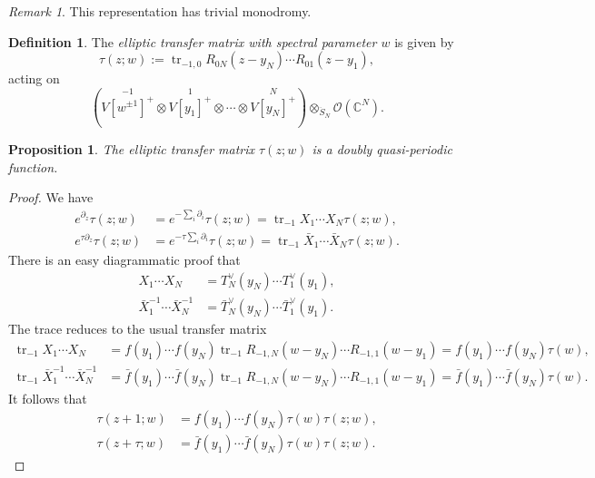 \documentclass[11pt]{report}
\newtheorem{prop}[theorem]{Proposition}
\theoremstyle{definition}
\newtheorem{definition}[theorem]{Definition}
\theoremstyle{remark}
\newtheorem*{remark}{Remark}
\theoremstyle{remark}
\newcommand{\C}{\mathbb{C}}
\begin{document}
\begin{remark}
This representation has trivial monodromy.
\end{remark}

\begin{definition}
The \emph{elliptic transfer matrix with spectral parameter $w$} is given by
\begin{equation*}
\tau(z;w) := \operatorname{tr}_{-1,0} R_{0N}(z-y_N) \cdots R_{01}(z-y_1),
\end{equation*}
acting on
\begin{equation*}
(\overset{-1}{V[w^{\pm 1}]^+} \otimes \overset{1}{V[y_1]^+} \otimes \cdots \otimes \overset{N}{V[y_N]^+}) \otimes_{\ddot S_N} \mathcal{O}(\C^N).
\end{equation*}
\end{definition}

\begin{prop}
The elliptic transfer matrix $\tau(z;w)$ is a doubly quasi-periodic function.
\end{prop}

\begin{proof}
We have
\begin{align*}
e^{\partial_z} \tau(z;w) &= e^{-\sum_i \partial_i} \tau(z;w) = \operatorname{tr}_{-1} X_1 \cdots X_N \tau(z;w), \\
e^{\tau \partial_z} \tau(z;w) &= e^{-\tau \sum_i \partial_i} \tau(z;w) = \operatorname{tr}_{-1} \bar X_1 \cdots \bar X_N \tau(z;w).
\end{align*}
There is an easy diagrammatic proof that
\begin{align*}
X_1 \cdots X_N &= T_N^\vee(y_N) \cdots T_1^\vee(y_1), \\
\bar X_1^{-1} \cdots \bar X_N^{-1} &= \bar T_N^\vee(y_N) \cdots \bar T_1^\vee(y_1).
\end{align*}
The trace reduces to the usual transfer matrix
\begin{align*}
\operatorname{tr}_{-1} X_1 \cdots X_N &= f(y_1) \cdots f(y_N) \operatorname{tr}_{-1} R_{-1,N}(w-y_N) \cdots R_{-1,1}(w-y_1) = f(y_1) \cdots f(y_N) \tau(w), \\
\operatorname{tr}_{-1} \bar X_1^{-1} \cdots \bar X_N^{-1} &= \bar f(y_1) \cdots \bar f(y_N) \operatorname{tr}_{-1} R_{-1,N}(w-y_N) \cdots R_{-1,1}(w-y_1) = \bar f(y_1) \cdots \bar f(y_N) \tau(w).
\end{align*}
It follows that
\begin{align*}
\tau(z+1;w) &= f(y_1) \cdots f(y_N) \tau(w) \tau(z;w), \\
\tau(z+\tau;w) &= \bar f(y_1) \cdots \bar f(y_N) \tau(w) \tau(z;w).
\end{align*}
\end{proof}
\end{document}
